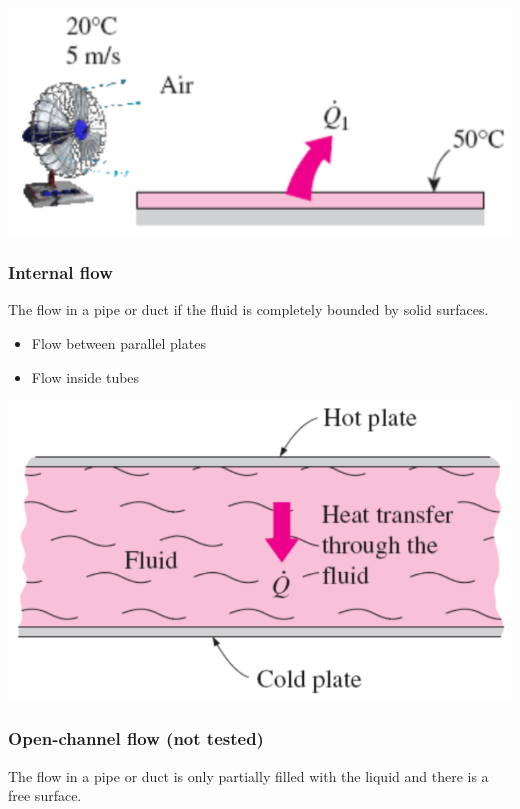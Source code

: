 \documentclass[11pt]{article}
\begin{document}
\begin{center}
\includegraphics[width=.9\linewidth]{./images/external-flow-diagram.png}
\end{center}

\subsubsection{Internal flow}
\label{sec:org77f1ad1}
The flow in a pipe or duct if the fluid is completely bounded by solid surfaces.
\begin{itemize}
\item Flow between parallel plates
\item Flow inside tubes
\end{itemize}

\begin{center}
\includegraphics[width=.9\linewidth]{./images/internal-flow-diagram.png}
\end{center}

\subsubsection{Open-channel flow (not tested)}
\label{sec:orge1d93ed}
The flow in a pipe or duct is only partially filled with the liquid and there is a free surface.
\end{document}
